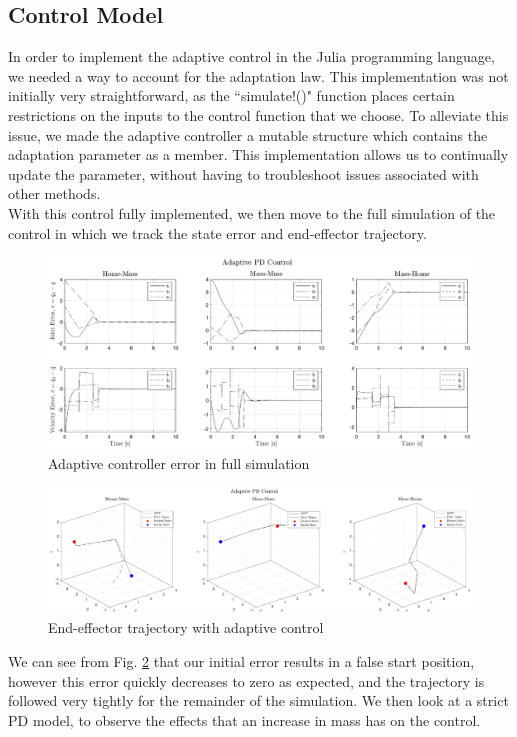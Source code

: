 \subsection*{Control Model}
In order to implement the adaptive control in the Julia programming language, we needed a way to account for the adaptation law. This implementation was not initially very straightforward, as the ``simulate!()" function places certain restrictions on the inputs to the control function that we choose. To alleviate this issue, we made the adaptive controller a mutable structure which contains the adaptation parameter as a member. This implementation allows us to continually update the parameter, without having to troubleshoot issues associated with other methods.\\

With this control fully implemented, we then move to the full simulation of the control in which we track the state error and end-effector trajectory.
\begin{figure}[H]
	\centering
	\includegraphics[width=\textwidth]{figures/mass10NNerrAPD.eps}
	\caption{Adaptive controller error in full simulation}
	\label{fig:nnerrapd}
\end{figure}
\begin{figure}[H]
	\centering
	\includegraphics[width=\textwidth]{figures/mass10NNeetrajAPD.eps}
	\caption{End-effector trajectory with adaptive control}
	\label{fig:nntrajapd}
\end{figure}
We can see from Fig. \ref{fig:nntrajapd} that our initial error results in a false start position, however this error quickly decreases to zero as expected, and the trajectory is followed very tightly for the remainder of the simulation. We then look at a strict PD model, to observe the effects that an increase in mass has on the control.
